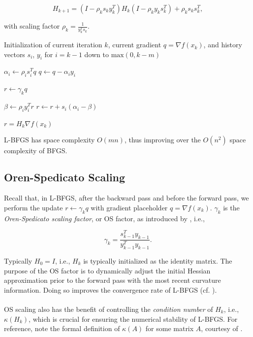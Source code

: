 \documentclass[twoside,11pt]{article}
\begin{document}
\begin{equation}
H_{k+1} = (I - \rho_k s_k y_k^T)H_k(I - \rho_k y_k s_k^T) + \rho_k s_k s_k^T,
\end{equation}

\noindent
with scaling factor  $\rho_k = \frac{1}{y_k^T s_k}$. 

\begin{algorithm}[H]
\caption{Limited-Memory Broyden-Fletcher-Goldfarb-Shanno (L-BFGS)}
\begin{algorithmic}

\Require Initialization of current iteration $k$, current gradient $q = \nabla f(x_k)$, and history vectors $s_i$, $y_i$ for $i = k-1$ down to $\text{max}(0, k-m)$

 
    \State $\alpha_i \gets \rho_i s_i^T q$
    \State $q \gets q - \alpha_i y_i$
\EndFor

\State $r \gets \gamma_k q$

 
    \State $\beta \gets \rho_i y_i^T r$
    \State $r \gets r + s_i(\alpha_i -\beta)$
\EndFor

\State \Return $r = H_k \nabla f(x_k)$
\end{algorithmic}
\end{algorithm}

\noindent
L-BFGS has space complexity $O(mn)$, thus improving over the $O(n^2)$ space complexity of BFGS. 

\subsection{Oren-Spedicato Scaling}

Recall that, in L-BFGS, after the backward pass and before the forward pass, we perform the update $r \gets \gamma_k q$ with gradient placeholder $q = \nabla f(x_k)$. $\gamma_k$ is the \textit{Oren-Spedicato scaling factor}, or OS factor, as introduced by \cite{OS76}, i.e.,

\begin{equation}
\gamma_k = \frac{s_{k-1}^T y_{k-1}}{y_{k-1}^T y_{k-1}}.
\end{equation}

\noindent
Typically $H_0 = I$, i.e., $H_k$ is typically initialized as the identity matrix. The purpose of the OS factor is to dynamically adjust the initial Hessian approximation prior to the forward pass with the most recent curvature information. Doing so improves the convergence rate of L-BFGS (cf. \cite{GR23}). \\
\\
OS scaling also has the benefit of controlling the \textit{condition number} of $H_k$, i.e., $\kappa(H_k)$, which is crucial for ensuring the numerical stability of L-BFGS. For reference, note the formal definition of $\kappa(A)$ for some matrix $A$, courtesy of \cite{Kre98}.
\end{document}
